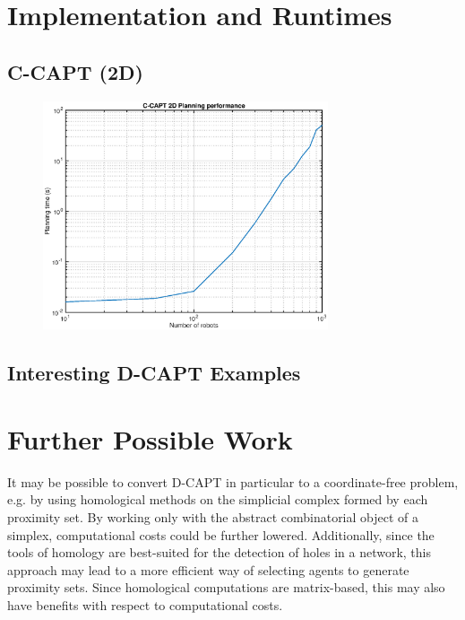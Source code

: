 \documentclass[11pt]{article}
\begin{document}
\section{Implementation and Runtimes}
\subsection{C-CAPT (2D)}
\begin{figure}[H]
\center
\includegraphics[width=0.75\textwidth]{images/timing_phase1.eps}
\end{figure}

\subsection{Interesting D-CAPT Examples}



\section{Further Possible Work}
It may be possible to convert D-CAPT in particular to a coordinate-free problem, e.g. by using homological methods on the simplicial complex formed by each proximity set. By working only with the abstract combinatorial object of a simplex, computational costs could be further lowered. Additionally, since the tools of homology are best-suited for the detection of holes in a network, this approach may lead to a more efficient way of selecting agents to generate proximity sets. Since homological computations are matrix-based, this may also have benefits with respect to computational costs.
\end{document}

